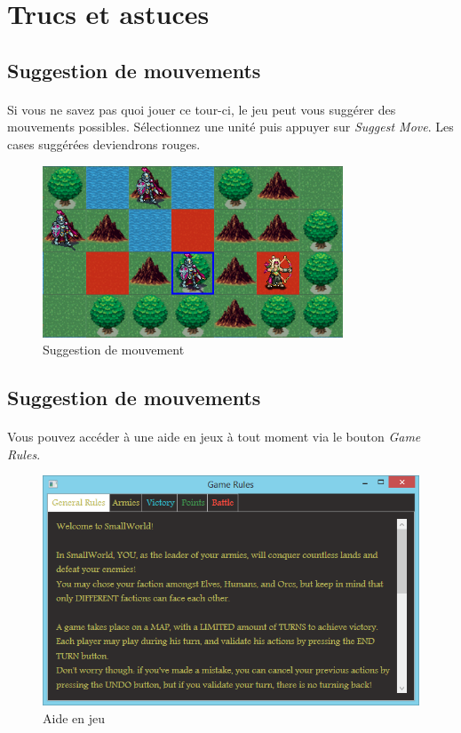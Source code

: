 \documentclass[a4paper]{article}
\begin{document}
\section{Trucs et astuces}

\subsection{Suggestion de mouvements}
\paragraph{}
Si vous ne savez pas quoi jouer ce tour-ci, le jeu peut vous suggérer des mouvements possibles. Sélectionnez une unité puis appuyer sur \textit{Suggest Move}. Les cases suggérées deviendrons rouges.

\begin{figure}[h]
\begin{center}
\includegraphics[scale=0.3]{./img/suggest_move.png}
\caption{Suggestion de mouvement}
\end{center}
\end{figure}

\subsection{Suggestion de mouvements}
\paragraph{}
Vous pouvez accéder à une aide en jeux à tout moment via le bouton \textit{Game Rules}.

\begin{figure}[h]
\begin{center}
\includegraphics[scale=0.3]{./img/help.png}
\caption{Aide en jeu}
\end{center}
\end{figure}
\end{document}
